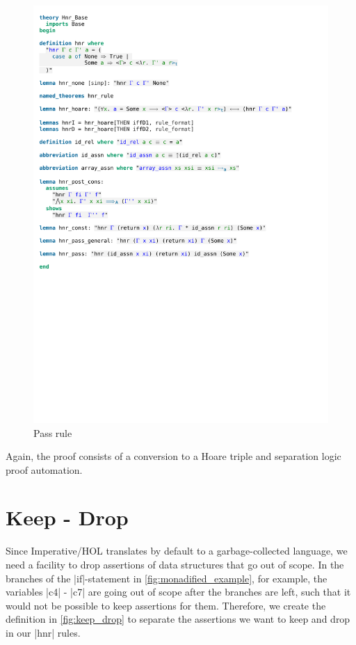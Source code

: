 \begin{figure}[htpb]
    \includegraphics[trim={0 11,8cm 0 16,4cm}, clip, width=1.00\textwidth]{figures/Theory_Hnr_Base.pdf}
    \caption[Pass rule]{Pass rule}
    \label{fig:hnr_pass}
\end{figure}

\noindent Again, the proof consists of a conversion to a Hoare triple and separation logic proof automation.

\section{Keep - Drop}\label{section:keep_drop}

Since Imperative/HOL translates by default to a garbage-collected language, we need a facility to drop assertions of data structures that go out of scope. In the branches of the |if|-statement in \autoref{fig:monadified_example}, for example, the variables |c4| - |c7| are going out of scope after the branches are left, such that it would not be possible to keep assertions for them. 
Therefore, we create the definition in \autoref{fig:keep_drop} to separate the assertions we want to keep and drop in our |hnr| rules.

